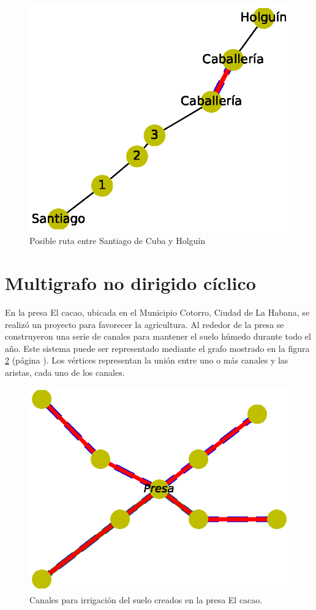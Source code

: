 \documentclass{article}
\begin{document}

\begin{figure}
  \includegraphics[width=.8\columnwidth]{7.eps}
  \vspace*{-8mm}
  \caption{Posible ruta entre Santiago de Cuba y Holguín}
  \label{fig:7}
\end{figure}

\section{Multigrafo no dirigido cíclico}

En la presa El cacao, ubicada en el Municipio Cotorro, Ciudad de La Habana, se realizó un proyecto para favorecer la agricultura. Al rededor de la presa se construyeron una serie de canales para mantener el suelo húmedo durante todo el año.
Este sistema puede ser representado mediante el grafo mostrado en la figura \ref{fig:8} (página \pageref{fig:8}). Los vértices representan la unión entre uno o más canales y las aristas, cada uno de los canales.



\begin{figure}
  \includegraphics[width=.8\columnwidth]{8.eps}
  \vspace*{-8mm}
  \caption{Canales para irrigación del suelo creados en la presa El cacao.}
  \label{fig:8}
\end{figure}
\end{document}
